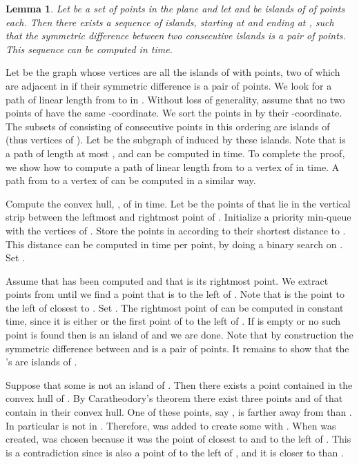 \documentclass{article}
\newtheorem{lemma}[theorem]{Lemma}
\def\QED{\ensuremath{{\square}}}
\def\markatright#1{\leavevmode\unskip\nobreak\quad\hspace*{\fill}{#1}}
\newenvironment{proof}
  {\begin{trivlist}\item[\hskip\labelsep{\bf Proof.}]}
  {\markatright{\QED}\end{trivlist}}
\begin{document}
\begin{lemma}\label{lem:island_graph}
Let  be a set of   points in the plane and 
let  and  be islands of  of  points each.
Then there exists a sequence of  islands, starting at  and ending at , such that the symmetric difference between two consecutive islands is a pair of points. 
This sequence can be computed in  time.
\end{lemma}

\begin{proof}
Let  be the graph whose vertices are all the islands of  with  points, two of which are adjacent in  if their symmetric difference is a pair of points. 
We look for a path of linear length from  to  in . 
Without loss of generality, assume that no two points of  have the same -coordinate.
We sort the points in  by their -coordinate. 
The subsets of  consisting of  consecutive points in this ordering are islands of  (thus vertices of ).
Let  be the subgraph of  induced by these islands.
Note that  is a path of length at most , and can be computed in  time.  
To complete the proof, we show how to compute a path of linear length from  to a vertex of  in  time. 
A path from  to a vertex of  can be computed in a similar way. 

Compute the convex hull, , of  in  time.  
Let  be the points of  that lie in the vertical strip between the leftmost and rightmost point of . 
Initialize a priority min-queue  with the vertices of .  
Store the points in  according to their shortest distance to . 
This distance can be computed in  time per point, by doing a binary search on  .  
Set . 

Assume that  has  been computed and that  is its rightmost point.  
We extract points from  until we find a point  that is to the left of . 
Note that  is the point to the left of  closest to . Set . 
The rightmost point  of  can be computed in constant time, since it is either  or the first point of  to the left of .  
If  is empty or no such point is found then  is an island of  and we are done.  
Note that by construction the symmetric difference between  and  is a pair of points. 
It remains to show that the 's are islands of .

Suppose that some  is not an island of . 
Then there exists a point  contained in the convex hull of .  
By Caratheodory's theorem there exist three points  and  of  that contain  in their convex hull. 
One of these points, say , is farther away from  than .  
In particular  is not in . Therefore,  was added to create some  with .  
When   was created,  was chosen because it was the point of  closest to  and to the left of . 
This is a contradiction since  is also a point of  to the left of , and it is closer to  than .
\end{proof}
\end{document}
